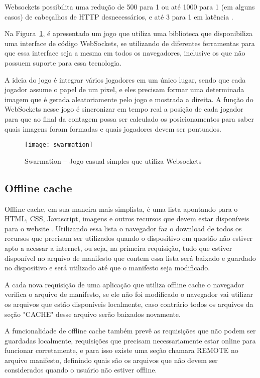 Websockets possibilita uma redução de 500 para 1 ou até 1000 para 1
(em alguns casos) de cabeçalhos de HTTP desnecessários, e até 3 para 1
em latência \cite{lubbers2010pro}.

Na Figura~\ref{img:swarmation}, é apresentado um jogo que utiliza
uma biblioteca que disponibiliza uma interface de código WebSockets,
se utilizando de diferentes ferramentas para que essa interface seja a mesma em
todos os navegadores, inclusive os que não possuem suporte para essa
tecnologia.

A ideia do jogo é integrar vários jogadores em um único lugar, sendo que
cada jogador assume o papel de um pixel, e eles precisam formar uma
determinada imagem que é gerada aleatoriamente pelo jogo e mostrada a
direita. A função do WebSockets nesse jogo é sincronizar em tempo real a
posição de cada jogador para que ao final da contagem possa ser
calculado os posicionamentos para saber quais imagens foram formadas e
quais jogadores devem ser pontuados.

\begin{figure}[H]
  \centering
	\texttt{[image: swarmation]}
  \caption{Swarmation {--} Jogo casual simples que utiliza Websockets}
  \label{img:swarmation}
\end{figure}


\subsection{Offline cache}

Offline cache, em sua maneira mais simplista, é uma lista apontando
para o HTML, CSS, Javascript, imagens e outros recursos que devem
estar disponíveis para o website \cite{pilgrim2010html5}. Utilizando
essa lista o navegador faz o download de todos os recursos que
precisam ser utilizados quando o dispositivo em questão não estiver
apto a acessar a internet, ou seja, na primeira requisição, tudo que estiver
disponível no arquivo de manifesto que contem essa lista será baixado
e guardado no dispositivo e será utilizado até que o manifesto seja
modificado.

A cada nova requisição de uma aplicação que utiliza offline cache o
navegador verifica o arquivo de manifesto, se ele não foi modificado
o navegador vai utilizar os arquivos que estão disponíveis localmente,
caso contrário todos os arquivos da seção "CACHE" desse arquivo serão baixados novamente.

A funcionalidade de offline cache também prevê as requisições que não
podem ser guardadas localmente, requisições que precisam
necessariamente estar online para funcionar corretamente, e para isso
existe uma seção chamara REMOTE no arquivo manifesto, definindo quais
são os arquivos que não devem ser considerados quando o usuário não
estiver offline.

